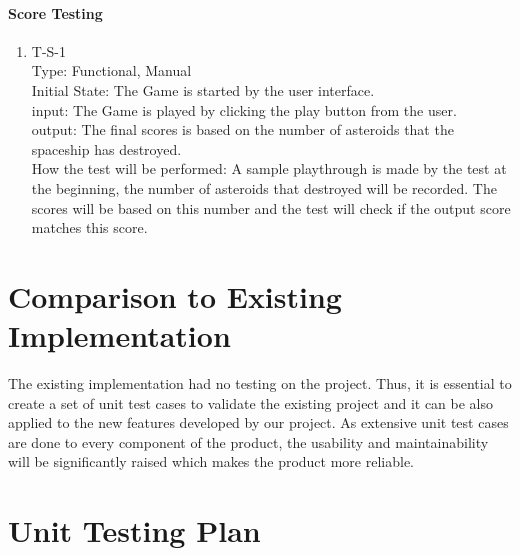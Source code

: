 \documentclass[12pt, titlepage]{article}
\begin{document}
\paragraph{Score Testing}

\begin{enumerate}

\item{T-S-1\\}
Type: Functional, Manual\\

Initial State: The Game is started by the user interface.\\

input: The Game is played by clicking the play button from the user.\\

output: The final scores is based on the number of asteroids that the spaceship has destroyed.\\

How the test will be performed: A sample playthrough is made by the test at the beginning, the number of asteroids that destroyed will be recorded. The scores will be based on this number and the test will check if the output score matches this score.\\


\end{enumerate}

	
\section{Comparison to Existing Implementation}	
The existing implementation had no testing on the project. Thus, it is essential to create a set of unit test cases to validate the existing project and it can be also applied to the new features developed by our project. As extensive unit test cases are done to every component of the product, the usability and maintainability will be significantly raised which makes the product more reliable.
				
\section{Unit Testing Plan}
		
\end{document}
